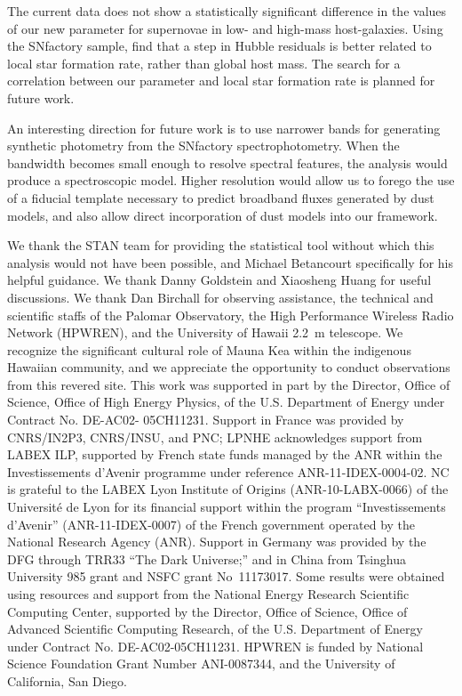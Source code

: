 \documentclass{aastex61}   	%
\begin{document}
The current data does not show a statistically significant difference in the values of our new parameter for supernovae
in low- and high-mass host-galaxies.
Using the SNfactory sample,
\citet{2013A&A...560A..66R,2017Rigault} find that a step in Hubble residuals is better related to local star formation rate, rather than
global host mass.  The search for a correlation between our parameter and local star formation rate is planned for future work.


An interesting direction for future work is to use narrower bands for generating synthetic photometry
from the SNfactory spectrophotometry.  When the bandwidth becomes small enough
to resolve spectral features, the analysis would produce a spectroscopic model.   Higher resolution would allow us to forego 
the use of a fiducial template necessary to predict broadband fluxes generated by dust models, and also allow direct incorporation
of dust models into our framework.

\acknowledgments
We thank the STAN team for providing the statistical tool without which this analysis would not have been possible,
and Michael Betancourt specifically for his helpful guidance.  We thank Danny Goldstein and
Xiaosheng Huang for useful discussions.
We thank Dan Birchall for observing assistance, the technical and
scientific staffs of the Palomar Observatory, the High Performance
Wireless Radio Network (HPWREN), and the University of Hawaii 2.2~m
telescope.  We recognize the significant cultural role of Mauna Kea
within the indigenous Hawaiian community, and we appreciate the
opportunity to conduct observations from this revered site.  This
work was supported in part by the Director, Office of Science,
Office of High Energy Physics, of the U.S. Department of Energy
under Contract No. DE-AC02- 05CH11231.  Support in France was
provided by CNRS/IN2P3, CNRS/INSU, and PNC; LPNHE acknowledges
support from LABEX ILP, supported by French state funds managed by
the ANR within the Investissements d'Avenir programme under reference
ANR-11-IDEX-0004-02.  NC is grateful to the LABEX Lyon Institute
of Origins (ANR-10-LABX-0066) of the Universit\'e de Lyon for its
financial support within the program ``Investissements d'Avenir''
(ANR-11-IDEX-0007) of the French government operated by the National
Research Agency (ANR).  Support in Germany was provided by the DFG
through TRR33 ``The Dark Universe;'' and in China from Tsinghua
University 985 grant and NSFC grant No~11173017.  Some results were
obtained using resources and support from the National Energy
Research Scientific Computing Center, supported by the Director,
Office of Science, Office of Advanced Scientific Computing Research,
of the U.S. Department of Energy under Contract No. DE-AC02-05CH11231.
HPWREN is funded by National Science Foundation Grant Number
ANI-0087344, and the University of California, San Diego.




\end{document}
